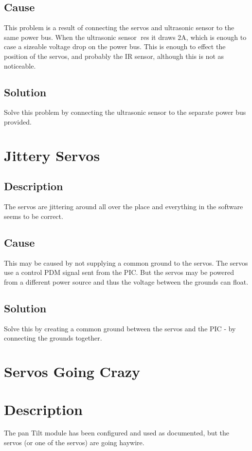 \documentclass[]{report}
\begin{document}
\subsection{Cause}
This problem is a result of connecting the servos and ultrasonic sensor to the same power bus. When the ultrasonic sensor res it draws 2A, which is enough to case a sizeable voltage drop on the power bus. This is enough to effect the position of the servos, and probably the IR sensor, although this is not as noticeable.

\subsection{Solution}
Solve this problem by connecting the ultrasonic sensor to the separate power bus provided.

\section{Jittery Servos}
\subsection{Description}
The servos are jittering around all over the place and everything in the software seems to be correct.

\subsection{Cause}
This may be caused by not supplying a common ground to the servos. The servos use a control PDM signal sent from the PIC. But the servos may be powered from a different power source and thus the voltage between the grounds can float.

\subsection{Solution}
Solve this by creating a common ground between the servos and the PIC - by connecting the grounds together.

\section{Servos Going Crazy}
\section{Description}
The pan Tilt module has been configured and used as documented, but the servos (or one of the servos) are going haywire.
\end{document}
